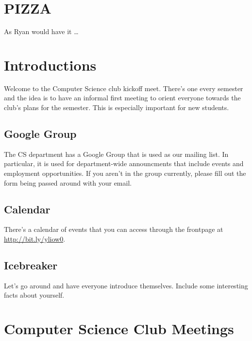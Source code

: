 

\renewcommand\TITLE{CCCS: Spring 2016 Agenda}


\topmatter


\section{PIZZA}
\label{sec-1}

As Ryan would have it \ldots{}


\newpage


\section{Introductions}
\label{sec-2}

Welcome to the Computer Science club kickoff meet. There's one every semester
and the idea is to have an informal first meeting to orient everyone towards
the club's plans for the semester. This is especially important for new
students.

\subsection{Google Group}
\label{sec-2-1}

The CS department has a Google Group that is used as our mailing list. In
particular, it is used for department-wide announcments that include events and
employment opportunities. If you aren't in the group currently, please fill out
the form being passed around with your email.

\subsection{Calendar}
\label{sec-2-2}

There's a calendar of events that you can access through the frontpage at
\url{http://bit.ly/yliow0}.

\subsection{Icebreaker}
\label{sec-2-3}

Let's go around and have everyone introduce themselves. Include some
interesting facts about yourself.


\newpage


\section{Computer Science Club Meetings}
\label{sec-3}

